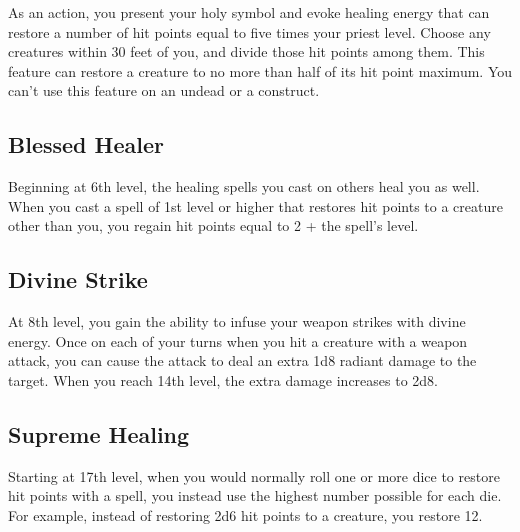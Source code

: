 As an action, you present your holy symbol and evoke healing energy that can restore a number of hit points equal to five times your priest level. Choose any creatures within 30 feet of you, and divide those hit points among them. This feature can restore a creature to no more than half of its hit point maximum. You can’t use this feature on an undead or a construct.

\subsection{Blessed Healer}

Beginning at 6th level, the healing spells you cast on others heal you as well. When you cast a spell of 1st level or higher that restores hit points to a creature other than you, you regain hit points equal to 2 + the spell’s level.

\subsection{Divine Strike}

At 8th level, you gain the ability to infuse your weapon strikes with divine energy. Once on each of your turns when you hit a creature with a weapon attack, you can cause the attack to deal an extra 1d8 radiant damage to the target. When you reach 14th level, the extra damage increases to 2d8.

\subsection{Supreme Healing}

Starting at 17th level, when you would normally roll one or more dice to restore hit points with a spell, you instead use the highest number possible for each die. For example, instead of restoring 2d6 hit points to a creature, you restore 12.